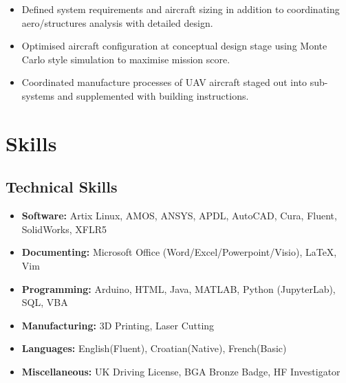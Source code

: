 \documentclass[a4paper,9pt]{article}
\begin{document}
\begin{itemize}[noitemsep]
	\item Defined system requirements and aircraft sizing in addition to coordinating aero/structures analysis with detailed design.
	\item Optimised aircraft configuration at conceptual design stage using Monte Carlo style simulation to maximise mission score.
	\item Coordinated manufacture processes of UAV aircraft staged out into sub-systems and supplemented with building instructions.

\end{itemize}
%
%
%

\section*{Skills}
\subsection*{Technical Skills}
\begin{itemize}[noitemsep]
    \item \textbf{Software:} Artix Linux, AMOS, ANSYS, APDL, AutoCAD, Cura, Fluent, SolidWorks, XFLR5
    \item \textbf{Documenting:}  Microsoft Office (Word/Excel/Powerpoint/Visio), LaTeX, Vim
    \item \textbf{Programming:}  Arduino, HTML, Java, MATLAB, Python (JupyterLab), SQL, VBA
    \item \textbf{Manufacturing:} 3D Printing, Laser Cutting
    \item \textbf{Languages:} English(Fluent), Croatian(Native), French(Basic)
    \item \textbf{Miscellaneous:} UK Driving License, BGA Bronze Badge, HF Investigator
\end{itemize}



\date{}
\end{document}
